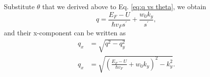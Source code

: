    Substitute $\theta$ that we derived above to Eq. \ref{eq:q vs theta}, we obtain
    \begin{equation} \label{eq:q}
        q = \frac{E_F-U}{\hbar v_F s^{\prime}}+\frac{w_0 k_y}{s^{\prime}},
    \end{equation}
    and their x-component can be written as
    \begin{equation} \label{eq:qx}
        \begin{aligned}
        q_x &= \sqrt{q^2-q_y^2}\\
        q_x &= \sqrt{\left(\frac{E_F-U}{\hbar v_F}+w_0 k_y\right)^2-k_y^2}.\\
        \end{aligned}
    \end{equation}

